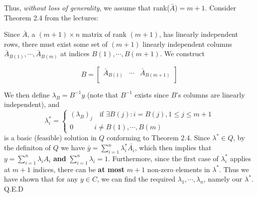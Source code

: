 \documentclass[11pt]{article}
\begin{document}
Thus, \emph{without loss of generality}, we assume that rank($\bar{A}$)$=m+1$. Consider Theorem 2.4 from the lectures:

\bigskip

\noindent{}

Since $\bar{A}$, a $(m+1)\times n$ matrix of rank $(m+1)$, has linearly independent rows, there must exist some set of $(m+1)$ linearly independent columns $\bar{A}_{B(1)},\cdots, \bar{A}_{B(m)}$ at indices $B(1),\cdots, B(m+1)$. We construct

$$
B=\begin{bmatrix}
\bar{A}_{B(1)} & \cdots & \bar{A}_{B(m+1)} \\
\end{bmatrix}
$$

We then define $\lambda_B=B^{-1}y$ (note that $B^{-1}$ exists since $B$'s columns are linearly independent), and
$$
\lambda_i^* = \begin{cases}
(\lambda_B)_j\quad \text{if }\exists B(j):i=B(j), 1\leq j\leq m+1\\
0\quad\quad\quad i\neq B(1), \cdots, B(m)
\end{cases}
$$
is a basic (feasible) solution in $Q$ conforming to Theorem 2.4. Since $\lambda^*\in Q$, by the definiton of $Q$ we have $\bar{y}=\sum_{i=1}^n\lambda_i^*\bar{A_i}$, which then implies that $y=\sum_{i=1}^n\lambda_iA_i$ \textbf{and} $\sum_{i=1}^n\lambda_i=1$. Furthermore, since the first case of $\lambda_i^*$ applies at $m+1$ indices, there can be \textbf{at most} $m+1$ non-zero elements in $\lambda^*$. Thus we have shown that for any $y\in C$, we can find the required $\lambda_1,\cdots, \lambda_n$, namely our $\lambda^*$. Q.E.D
\end{document}
